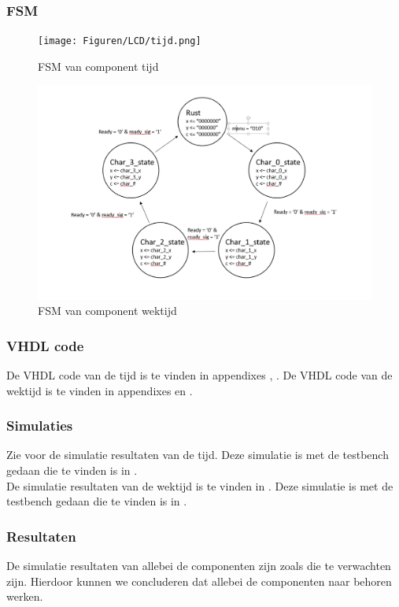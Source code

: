 \subsubsection{FSM}
\begin{figure}[h!]
	\center
	\texttt{[image: Figuren/LCD/tijd.png]}
	\caption{FSM van component tijd}
	\label{fig:fsm_tijd}
\end{figure}
\begin{figure}[h!]
	\center
	\includegraphics[scale=1.9]{Figuren/LCD/fsm_wektijd.png}
	\caption{FSM van component wektijd}
	\label{fig:fsm_wektijd}
\end{figure}

\subsubsection{VHDL code}
De VHDL code van de tijd is te vinden in appendixes \cite{code:ent_tijd}, \cite{code:beh_tijd}. De VHDL code van de wektijd is te vinden in appendixes \cite{code:ent_wektijd} en \cite{code:beh_wektijd}.

\subsubsection{Simulaties}
Zie \cite{fig:sim_tijd} voor de simulatie resultaten van de tijd. Deze simulatie is met de testbench gedaan die te vinden is in \cite{????}.\\
De simulatie resultaten van de wektijd is te vinden in \cite{fig:sim_wektijd}. Deze simulatie is met de testbench gedaan die te vinden is in \cite{????}.

\subsubsection{Resultaten}
De simulatie resultaten van allebei de componenten zijn zoals die te verwachten zijn. Hierdoor kunnen we concluderen dat allebei de componenten naar behoren werken.


